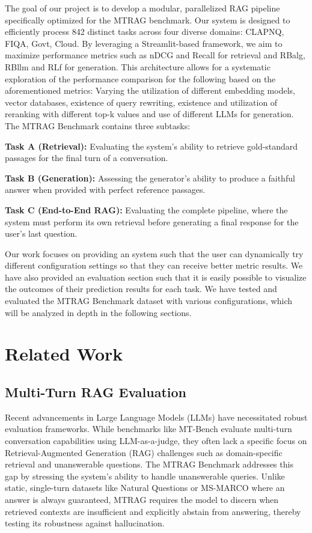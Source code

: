 \documentclass[11pt]{article}
\begin{document}
The goal of our project is to develop a modular, parallelized RAG pipeline specifically optimized for the MTRAG benchmark. Our system is designed to efficiently process 842 distinct tasks across four diverse domains: CLAPNQ, FIQA, Govt, Cloud. By leveraging a Streamlit-based framework, we aim to maximize performance metrics such as nDCG and Recall for retrieval and RBalg, RBllm and RLf for generation. This architecture allows for a systematic exploration of the performance comparison for the following based on the aforementioned metrics: Varying the utilization of different embedding models, vector databases, existence of query rewriting, existence and utilization of reranking with different top-k values and use of different LLMs for generation. 
The MTRAG Benchmark contains three subtasks: 

\textbf{Task A (Retrieval): } Evaluating the system's ability to retrieve gold-standard passages for the final turn of a conversation.

\textbf{Task B (Generation): } Assessing the generator's ability to produce a faithful answer when provided with perfect reference passages.

\textbf{Task C (End-to-End RAG): } Evaluating the complete pipeline, where the system must perform its own retrieval before generating a final response for the user’s last question.

Our work focuses on providing an system such that the user can dynamically try different configuration settings so that they can receive better metric results. We have also provided an evaluation section such that it is easily possible to visualize the outcomes of their prediction results for each task. We have tested and evaluated the MTRAG Benchmark dataset with various configurations, which will be analyzed in depth in the following sections.

\section{Related Work}
\subsection{Multi-Turn RAG Evaluation}
Recent advancements in Large Language Models (LLMs) have necessitated robust evaluation frameworks. While benchmarks like MT-Bench \citet{zheng2023judging} evaluate multi-turn conversation capabilities using LLM-as-a-judge, they often lack a specific focus on Retrieval-Augmented Generation (RAG) challenges such as domain-specific retrieval and unanswerable questions. The MTRAG Benchmark \citet{katsis2025mtrag} addresses this gap by stressing the system's ability to handle unanswerable queries. Unlike static, single-turn datasets like Natural Questions or MS-MARCO where an answer is always guaranteed, MTRAG requires the model to discern when retrieved contexts are insufficient and explicitly abstain from answering, thereby testing its robustness against hallucination.
\end{document}
